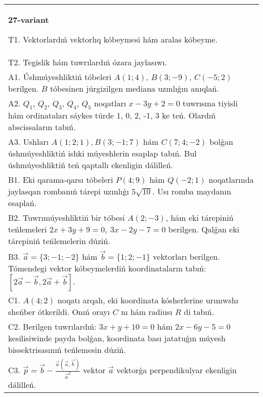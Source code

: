 \documentclass{article}
\begin{document}
\begin{tabular}{m{17cm}}
\textbf{27-variant}
\newline

T1. 
Vektorlardıń vektorlıq kóbeymesi hám aralas kóbeyme.
 \\
T2. 
Tegislik hám tuwrılardıń ózara jaylasıwı.
 \\
A1. 
Úshmúyeshliktiń tóbeleri $A(1;4)$, $B(3;-9)$, $C(-5;2)$
berilgen. $B$ tóbesinen júrgizilgen mediana uzınlıǵın anıqlań.
 \\
A2. 
$Q_1$, $Q_2$, $Q_3$, $Q_4$, $Q_5$ noqatları 
$x-3y+2=0$ tuwrısına tiyisli hám ordinataları sáykes túrde 
1, 0, 2, -1, 3 ke teń. Olardıń abscissaların tabıń.
 \\
A3. 
Ushları $A (1;2;1), B (3;-1;7)$ hám $C(7;4;-2)$ bolǵan úshmúyeshliktiń
ishki múyeshlerin esaplap tabıń. Bul úshmúyeshliktiń teń qaptallı ekenligin dálilleń. 
 \\
B1. Eki qarama-qarsı tóbeleri \(P(4;9)\) hám \(Q(-2; 1)\) noqatlarında jaylasqan rombanıń tárepi uzınlıǵı \(5\sqrt{10}\). Usı
romba maydanın esaplań.
 \\
B2. 
Tuwrımúyeshliktiń bir tóbesi \(A(2;-3)\), hám eki
tárepiniń teńlemeleri \(2x+3y+9=0,\ 3x-2y-7=0\)
berilgen. Qalǵan eki tárepiniń teńlemelerin dúziń.
 \\
B3. 
$\vec{a} = \{ 3; - 1; - 2\}$ hám $\vec{b} = \{ 1;2; - 1\}$ vektorları berilgen. Tómendegi vektor kóbeymelerdiń koordinataların tabıń: 
$\left\lbrack 2\vec{a} - \vec{b},2\vec{a} + \vec{b} \right\rbrack$.
 \\
C1. \(A(4;2)\) noqatı arqalı, eki koordinata kósherlerine
urınıwshı sheńber ótkerildi. Onıń orayı $C$ nı hám radiusı
$R$ di tabıń.
 \\
C2. 
Berilgen tuwrılardıń:
\(3x + y + 10 = 0\) hám \(2x - 6y - 5 = 0\) kesilisiwinde payda
bolǵan, koordinata bası jatatuǵın múyesh bissektrisasınıń teńlemesin
dúziń.
 \\
C3. 
\(\vec{p} = \vec{b} - \frac{\vec{a} (\vec{a},\vec{b}) }{{\vec{a}}^{2}}\) vektor \(\vec{a}\) vektorǵa perpendikulyar ekenligin dálilleń.
 \\

\end{tabular}
\vspace{1cm}
\end{document}
